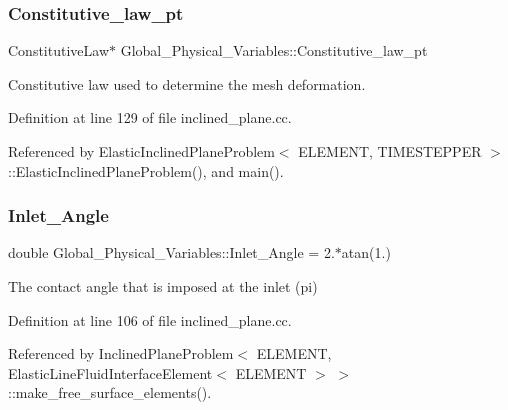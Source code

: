 \mbox{\label{namespaceGlobal__Physical__Variables_a2a37fb040c832ee7a086bb13bb02a100}} 
\subsubsection{\texorpdfstring{Constitutive\+\_\+law\+\_\+pt}{Constitutive\_law\_pt}}
{\footnotesize\ttfamily Constitutive\+Law$\ast$ Global\+\_\+\+Physical\+\_\+\+Variables\+::\+Constitutive\+\_\+law\+\_\+pt}



Constitutive law used to determine the mesh deformation. 



Definition at line 129 of file inclined\+\_\+plane.\+cc.



Referenced by Elastic\+Inclined\+Plane\+Problem$<$ E\+L\+E\+M\+E\+N\+T, T\+I\+M\+E\+S\+T\+E\+P\+P\+E\+R $>$\+::\+Elastic\+Inclined\+Plane\+Problem(), and main().

\mbox{\label{namespaceGlobal__Physical__Variables_a1c3587461447262715bd444ac91a29c9}} 
\subsubsection{\texorpdfstring{Inlet\+\_\+\+Angle}{Inlet\_Angle}}
{\footnotesize\ttfamily double Global\+\_\+\+Physical\+\_\+\+Variables\+::\+Inlet\+\_\+\+Angle = 2.$\ast$atan(1.)}



The contact angle that is imposed at the inlet (pi) 



Definition at line 106 of file inclined\+\_\+plane.\+cc.



Referenced by Inclined\+Plane\+Problem$<$ E\+L\+E\+M\+E\+N\+T, Elastic\+Line\+Fluid\+Interface\+Element$<$ E\+L\+E\+M\+E\+N\+T $>$ $>$\+::make\+\_\+free\+\_\+surface\+\_\+elements().

